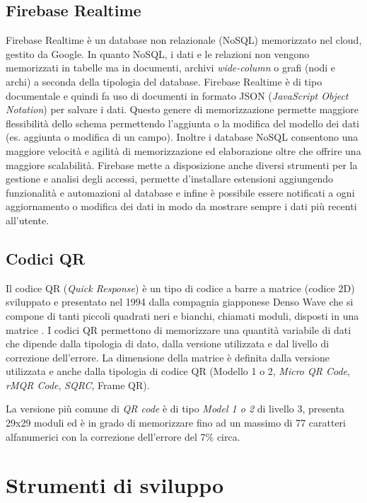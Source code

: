 \subsection{Firebase Realtime}
Firebase Realtime \cite{firebase} è un database non relazionale (NoSQL) memorizzato nel cloud, gestito da Google. In quanto NoSQL, i dati e le relazioni non vengono memorizzati in tabelle ma in documenti, archivi \textit{wide-column} o grafi (nodi e archi) a seconda della tipologia del database.
Firebase Realtime è di tipo documentale e quindi fa uso di documenti in formato JSON (\textit{JavaScript Object Notation}) per salvare i dati. Questo genere di memorizzazione permette maggiore flessibilità dello schema permettendo l'aggiunta o la modifica del modello dei dati (es. aggiunta o modifica di un campo). Inoltre i database NoSQL consentono una maggiore velocità e agilità di memorizzazione ed elaborazione oltre che offrire una maggiore scalabilità.
Firebase mette a disposizione anche diversi strumenti per la gestione e analisi degli accessi, permette d'installare estensioni aggiungendo funzionalità e automazioni al database e infine è possibile essere notificati a ogni aggiornamento o modifica dei dati in modo da mostrare sempre i dati più recenti all'utente.

%
\subsection{Codici QR}
Il codice QR (\textit{Quick Response}) è un tipo di codice a barre a matrice (codice 2D) sviluppato e presentato nel 1994 dalla compagnia giapponese Denso Wave che si compone di tanti piccoli quadrati neri e bianchi, chiamati moduli, disposti in una matrice \cite{qrCodeDensoWave}.
I codici QR permettono di memorizzare una quantità variabile di dati che dipende dalla tipologia di dato, dalla versione utilizzata e dal livello di correzione dell'errore. La dimensione della matrice è definita dalla versione utilizzata e anche dalla tipologia di codice QR (Modello 1 o 2, \textit{Micro QR Code}, \textit{rMQR Code}, \textit{SQRC}, Frame QR).

La versione più comune di \textit{QR code} è di tipo \textit{Model 1 o 2} di livello 3, presenta 29x29 moduli ed è in grado di memorizzare fino ad un massimo di 77 caratteri alfanumerici con la correzione dell'errore del 7\% circa.

\section{Strumenti di sviluppo}
